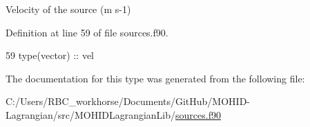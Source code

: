 Velocity of the source (m s-\/1) 



Definition at line 59 of file sources.\+f90.


\begin{DoxyCode}
59         \textcolor{keywordtype}{type}(vector) :: vel
\end{DoxyCode}


The documentation for this type was generated from the following file\+:\begin{DoxyCompactItemize}
\item 
C\+:/\+Users/\+R\+B\+C\+\_\+workhorse/\+Documents/\+Git\+Hub/\+M\+O\+H\+I\+D-\/\+Lagrangian/src/\+M\+O\+H\+I\+D\+Lagrangian\+Lib/\mbox{\hyperlink{sources_8f90}{sources.\+f90}}\end{DoxyCompactItemize}
